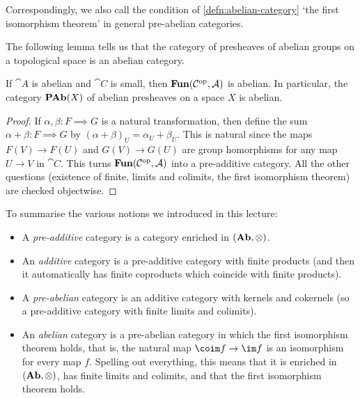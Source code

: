 \documentclass[../main.tex]{subfiles}
\begin{document}
Correspondingly, we also call the condition of \cref{defn:abelian-category} `the first isomorphism theorem' in general pre-abelian categories.

The following lemma tells us that the category of presheaves of abelian groups on a topological space is an abelian category. 
\begin{lem}
If $\cat A$ is abelian and $\cat C$ is small, then $\operatorname{\mathbf{Fun}}(\mathcal{C}^{\mathrm{op}}, \mathcal{A})$ is abelian.
In particular, the category \(\operatorname{\mathbf{PAb}}(X)\) of abelian presheaves on a space \(X\) is abelian.
\end{lem}
\begin{proof}
  If $\alpha, \beta\colon F \implies G$ is a natural transformation, then define the sum $\alpha + \beta\colon F \implies G$ by $(\alpha + \beta)_U = \alpha_U + \beta_U$. This is natural since the maps $F(V) \to F(U)$ and $G(V) \to G(U)$ are group homorphisms for any map $U \to V$ in $\cat C$. This turns $\operatorname{\mathbf{Fun}}(\mathcal{C}^{\mathrm{op}}, \mathcal{A})$ into a pre-additive category. All the other questions (existence of finite, limits and colimits, the first isomorphism theorem) are checked objectwise.
\end{proof}

To summarise the various notions we introduced in this lecture:
\begin{itemize}
\item A \emph{pre-additive} category is a category enriched in \((\mathbf{Ab},\otimes)\).
\item An \emph{additive} category is a pre-additive category with finite products (and then it automatically has finite coproducts which coincide with finite products).
\item A \emph{pre-abelian} category is an additive category with kernels and cokernels (so a pre-additive category with finite limits and colimits).
\item An \emph{abelian} category is a pre-abelian category in which the first isomorphism theorem holds, that is, the natural map \(\coim f\to\im f\) is an isomorphism for every map \(f\).
  Spelling out everything, this means that it is enriched in \((\mathbf{Ab},\otimes)\), has finite limits and colimits, and that the first isomorphism theorem holds.
\end{itemize}
\end{document}
